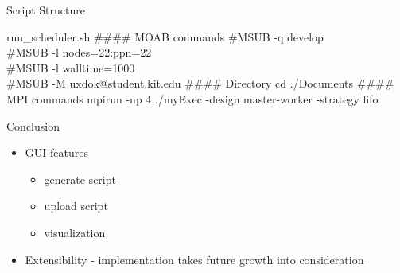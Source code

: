 	\begin{frame}{Script Structure}
		
		\begin{block}{run\_scheduler.sh}
		        \#\#\#\# MOAB commands
		        \newline
		        \newline
				\#MSUB  -q develop\\
				\#MSUB  -l nodes=22:ppn=22\\
				\#MSUB  -l walltime=1000\\
				\#MSUB  -M uxdok@student.kit.edu
				\newline
				\newline
        				\#\#\#\# Directory
				\newline
				\newline
				cd ./Documents
				\newline
				\newline
        				\#\#\#\# MPI commands
        			\newline
        			\newline
				mpirun -np 4 ./myExec -design master-worker -strategy fifo
			
		\end{block}
	\end{frame}
	
	
\begin{frame}{Conclusion}
\begin{itemize}
\pause
\item GUI features
\begin{itemize}
			\pause
			 \item generate script
			 \pause
			 \item upload script
			 \pause
			 \item visualization
\end{itemize}
			
\pause
\item \Smiley{} Extensibility - implementation takes future growth into consideration 
	\end{itemize}
		
	\end{frame}
	